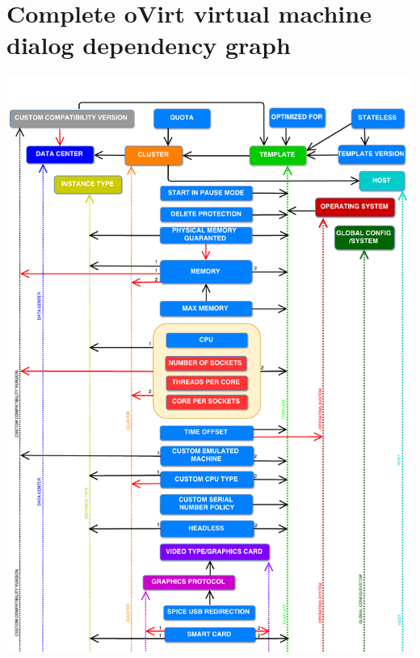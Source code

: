 \chapter{Complete oVirt virtual machine dialog dependency graph} \label{graph}
\newpage
\includegraphics[page=1, width=1.05\textwidth, angle=0]{DependencyGraph}
\newpage
